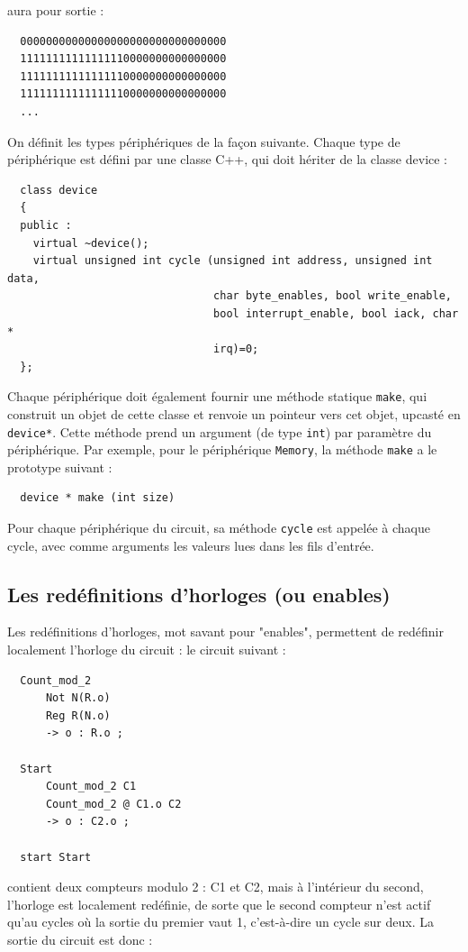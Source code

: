 \documentclass[13pt]{article}
\begin{document}
aura pour sortie :

\begin{verbatim}
  00000000000000000000000000000000
  11111111111111110000000000000000
  11111111111111110000000000000000
  11111111111111110000000000000000
  ...
\end{verbatim}

On définit les types périphériques de la façon suivante.
Chaque type de périphérique est défini par une classe C++, qui doit
hériter de la classe device :
\begin{verbatim}
  class device
  {
  public :
    virtual ~device();
    virtual unsigned int cycle (unsigned int address, unsigned int data,
                                char byte_enables, bool write_enable,
                                bool interrupt_enable, bool iack, char *
                                irq)=0;
  };
\end{verbatim}
Chaque périphérique doit également fournir une méthode statique \texttt{make}, qui
construit un objet de cette classe et renvoie un pointeur vers cet objet,
upcasté en \texttt{device*}. Cette méthode prend un argument (de type \texttt{int}) par
paramètre du périphérique. Par exemple, pour le périphérique \texttt{Memory}, la
méthode \texttt{make} a le prototype suivant :

\begin{verbatim}
  device * make (int size)
\end{verbatim}

Pour chaque périphérique du circuit, sa méthode \texttt{cycle} est appelée à
chaque cycle, avec comme arguments les valeurs lues dans les fils d'entrée.


\subsection{Les redéfinitions d'horloges (ou enables)}

Les redéfinitions d'horloges, mot savant pour "enables", permettent de redéfinir localement l'horloge du circuit :
le circuit suivant :
\begin{verbatim}
  Count_mod_2
      Not N(R.o)
      Reg R(N.o)
      -> o : R.o ;

  Start
      Count_mod_2 C1
      Count_mod_2 @ C1.o C2
      -> o : C2.o ;

  start Start
\end{verbatim}

contient deux compteurs modulo 2 : C1 et C2, mais à l'intérieur du second,
l'horloge est localement redéfinie, de sorte que le second compteur n'est
actif qu'au cycles où la sortie du premier vaut 1, c'est-à-dire un cycle
sur deux. La sortie du circuit est donc :
\end{document}
